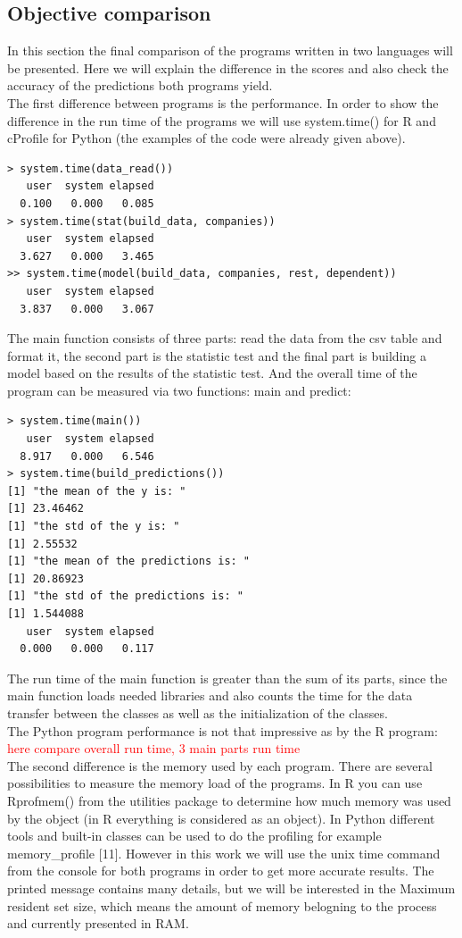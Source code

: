 \documentclass{article}
\begin{document}
\subsection{Objective comparison}
In this section the final comparison of the programs written in two languages will be presented. Here we will explain the difference in the scores and also check the accuracy of the predictions both programs yield.\\
The first difference between programs is the performance. In order to show the difference in the run time of the programs we will use system.time() for R and cProfile for Python (the examples of the code were already given above).
\begin{verbatim}
> system.time(data_read())                                                                  
   user  system elapsed                                                                       
  0.100   0.000   0.085  
> system.time(stat(build_data, companies))
   user  system elapsed 
  3.627   0.000   3.465
>> system.time(model(build_data, companies, rest, dependent))
   user  system elapsed 
  3.837   0.000   3.067 
\end{verbatim}
The main function consists of three parts: read the data from the csv table and format it, the second part is the statistic test and the final part is building a model based on the results of the statistic test. And the overall time of the program can be measured via two functions: main and predict:
\begin{verbatim}
> system.time(main())
   user  system elapsed 
  8.917   0.000   6.546 
> system.time(build_predictions())
[1] "the mean of the y is: "
[1] 23.46462
[1] "the std of the y is: "
[1] 2.55532
[1] "the mean of the predictions is: "
[1] 20.86923
[1] "the std of the predictions is: "
[1] 1.544088
   user  system elapsed 
  0.000   0.000   0.117 
\end{verbatim}
The run time of the main function is greater than the sum of its parts, since the main function loads needed libraries and also counts the time for the data transfer between the classes as well as the initialization of the classes.\\
The Python program performance is not that impressive as by the R program:\\
\textcolor{red}{here compare overall run time, 3 main parts run time}
\\
The second difference is the memory used by each program. There are several possibilities to measure the memory load of the programs. In R you can use Rprofmem() from the utilities package to determine how much memory was used by the object (in R everything is considered as an object). In Python different tools and built-in classes can be used to do the profiling for example memory\_profile [11]. However in this work we will use the unix time command from the console for both programs in order to get more accurate results. The printed message contains many details, but we will be interested in the Maximum resident set size, which means the amount of memory belogning to the process and currently presented in RAM.\\ 
\end{document}
